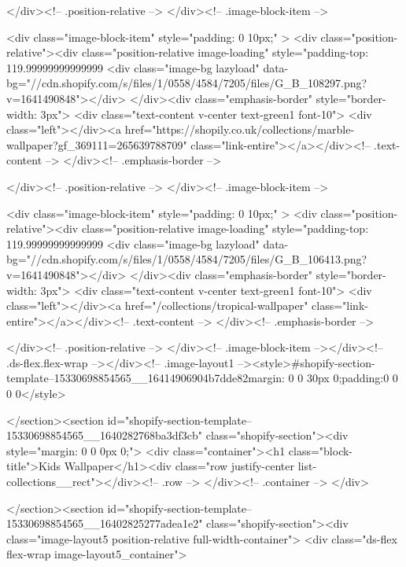 {{{{{{{          </div><!-- .position-relative -->
        </div><!-- .image-block-item -->

        <div class="image-block-item" style="padding: 0 10px;" >
          <div class="position-relative"><div class="position-relative image-loading" style="padding-top: 119.99999999999999%
                <div class="image-bg lazyload" data-bg="//cdn.shopify.com/s/files/1/0558/4584/7205/files/G_B_108297.png?v=1641490848"></div>
              </div><div class="emphasis-border" style="border-width: 3px">
              <div class="text-content v-center text-green1 font-10">
                <div class="left"></div><a href="https://shopily.co.uk/collections/marble-wallpaper?gf_369111=265639788709" class="link-entire"></a></div><!-- .text-content -->
            </div><!-- .emphasis-border -->

          </div><!-- .position-relative -->
        </div><!-- .image-block-item -->

        <div class="image-block-item" style="padding: 0 10px;" >
          <div class="position-relative"><div class="position-relative image-loading" style="padding-top: 119.99999999999999%
                <div class="image-bg lazyload" data-bg="//cdn.shopify.com/s/files/1/0558/4584/7205/files/G_B_106413.png?v=1641490848"></div>
              </div><div class="emphasis-border" style="border-width: 3px">
              <div class="text-content v-center text-green1 font-10">
                <div class="left"></div><a href="/collections/tropical-wallpaper" class="link-entire"></a></div><!-- .text-content -->
            </div><!-- .emphasis-border -->

          </div><!-- .position-relative -->
        </div><!-- .image-block-item --></div><!-- .ds-flex.flex-wrap --></div><!-- .image-layout1 --><style>#shopify-section-template--15330698854565__16414906904b7dde82{margin: 0 0 30px 0;padding:0 0 0 0}</style>

</section><section id="shopify-section-template--15330698854565__1640282768ba3df3cb" class="shopify-section"><div style="margin: 0 0 0px 0;">
  <div class="container"><h1 class="block-title">Kids Wallpaper</h1><div class="row justify-center list-collections__rect"></div><!-- .row -->
  </div><!-- .container -->
</div>


</section><section id="shopify-section-template--15330698854565__16402825277adea1e2" class="shopify-section"><div class="image-layout5 position-relative full-width-container">
  <div class="ds-flex flex-wrap image-layout5_container">

}}}}}}}
